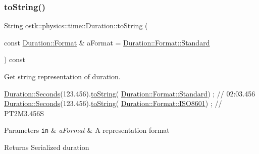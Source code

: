 \subsubsection{\texorpdfstring{to\+String()}{toString()}}
{\footnotesize\ttfamily String ostk\+::physics\+::time\+::\+Duration\+::to\+String (\begin{DoxyParamCaption}\item[{const \hyperlink{classostk_1_1physics_1_1time_1_1_duration_a4bf616b67d15e0fbc4beb4fcc306c368}{Duration\+::\+Format} \&}]{a\+Format = {\ttfamily \hyperlink{classostk_1_1physics_1_1time_1_1_duration_a4bf616b67d15e0fbc4beb4fcc306c368aeb6d8ae6f20283755b339c0dc273988b}{Duration\+::\+Format\+::\+Standard}} }\end{DoxyParamCaption}) const}



Get string representation of duration. 


\begin{DoxyCode}
\hyperlink{classostk_1_1physics_1_1time_1_1_duration_ad973fa34fcc308fdcc8d50c3ee694764}{Duration::Seconds}(123.456).\hyperlink{classostk_1_1physics_1_1time_1_1_duration_a20ef00f7f5889c3e815800bb72920482}{toString}(
      \hyperlink{classostk_1_1physics_1_1time_1_1_duration_a4bf616b67d15e0fbc4beb4fcc306c368aeb6d8ae6f20283755b339c0dc273988b}{Duration::Format::Standard}) ; \textcolor{comment}{// 02:03.456}
\hyperlink{classostk_1_1physics_1_1time_1_1_duration_ad973fa34fcc308fdcc8d50c3ee694764}{Duration::Seconds}(123.456).\hyperlink{classostk_1_1physics_1_1time_1_1_duration_a20ef00f7f5889c3e815800bb72920482}{toString}(
      \hyperlink{classostk_1_1physics_1_1time_1_1_duration_a4bf616b67d15e0fbc4beb4fcc306c368a35b6786739efcdc5a74ab1dca29d3b6b}{Duration::Format::ISO8601}) ; \textcolor{comment}{// PT2M3.456S}
\end{DoxyCode}



\begin{DoxyParams}[1]{Parameters}
\mbox{\tt in}  & {\em a\+Format} & A representation format \\
\hline
\end{DoxyParams}
\begin{DoxyReturn}{Returns}
Serialized duration 
\end{DoxyReturn}
\mbox{\label{classostk_1_1physics_1_1time_1_1_duration_a568046182c0bc460b7e93de8b4084768}} 
